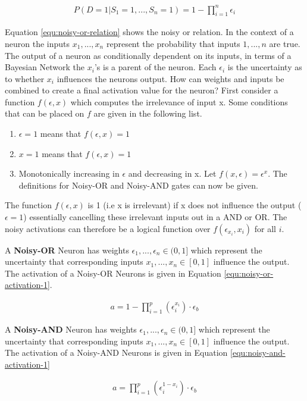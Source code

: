 \begin{align}
P(D = 1 | S_1 = 1, ..., S_n = 1) = 1 - \prod^n_{i=1} \epsilon_i
\label{equ:noisy-or-relation}
\end{align}

Equation \ref{equ:noisy-or-relation} shows the noisy or relation. In the context of a neuron the inputs $x_1, ..., x_n$ represent the probability that inputs $1, ..., n$ are true. The output of a neuron as conditionally dependent on its inputs, in terms of a Bayesian Network the $x_i$'s is a parent of the neuron. Each $\epsilon_i$ is the uncertainty as to whether $x_i$ influences the neurons output. How can weights and inputs be combined to create a final activation value for the neuron? First consider a function $f(\epsilon, x)$ which computes the irrelevance of input x. Some conditions \cite{LearningLogicalActivations} that can be placed on $f$ are given in the following list. 

\begin{enumerate}
	\item $\epsilon = 1$ means that $f(\epsilon, x) = 1$
	\item $x = 1$ means that $f(\epsilon, x) = 1$
	\item Monotonically increasing in $\epsilon$ and decreasing in x. Let $f(x, \epsilon) = \epsilon^x$. The definitions for Noisy-OR and Noisy-AND gates can now be given.
\end{enumerate}

The function $f(\epsilon, x)$ is 1 (i.e x is irrelevant) if x does not influence the output ($\epsilon = 1$) essentially cancelling these irrelevant inputs out in a AND or OR. The noisy activations can therefore be a logical function over $f(\epsilon_{x_i}, x_i)$ for all $i$.

\begin{definition}
	A \textbf{Noisy-OR} Neuron has weights $\epsilon_1, ..., \epsilon_n \in (0,1]$ which represent the uncertainty that corresponding inputs $x_1, ..., x_n \in [0,1]$ influence the output. The activation of a Noisy-OR Neurons is given in Equation \ref{equ:noisy-or-activation-1}.
	
	\begin{align}
	a = 1 - \prod^p_{i=1} (\epsilon_i^{x_i}) \cdot \epsilon_b
	\label{equ:noisy-or-activation-1}
	\end{align}
\end{definition}

\begin{definition}
	A \textbf{Noisy-AND} Neuron has weights $\epsilon_1, ..., \epsilon_n \in (0, 1]$ which represent the uncertainty that corresponding inputs $x_1, ..., x_n \in [0,1]$ influence the output. The activation of a Noisy-AND Neurons is given in Equation \ref{equ:noisy-and-activation-1}
	
	\begin{align}
	a = \prod^p_{i=1} (\epsilon_i^{1 - x_i}) \cdot \epsilon_b
	\label{equ:noisy-and-activation-1}
	\end{align}
\end{definition}

